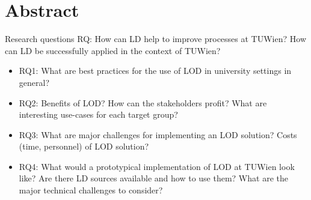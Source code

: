 \chapter{Abstract}
Research questions RQ: How can LD help to improve processes at TUWien? How can LD be successfully applied in the context of TUWien?

\begin{itemize}
	\item RQ1: What are best practices for the use of LOD in university settings in general?
	\item RQ2: Benefits of LOD? How can the stakeholders profit? What are interesting use-cases for each target group?
	\item RQ3: What are major challenges for implementing an LOD solution? Costs (time, personnel) of LOD solution?
	\item RQ4: What would a prototypical implementation of LOD at TUWien look like? Are there LD sources available and how to use them? What are the major technical challenges to consider?
\end{itemize}
